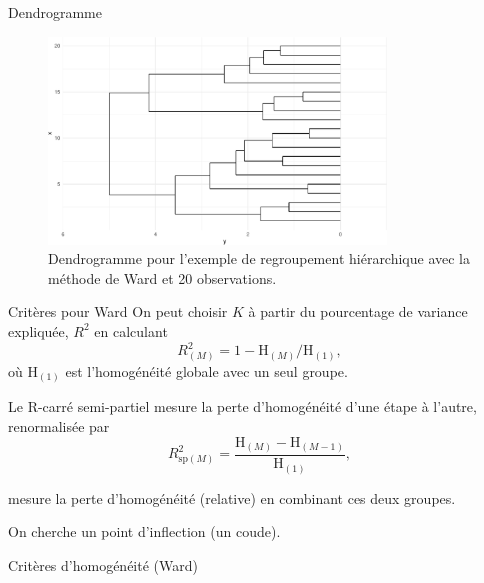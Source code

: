 \documentclass[
  ignorenonframetext,
]{beamer}
\begin{document}
\begin{frame}{Dendrogramme}
\protect\hypertarget{dendrogramme}{}
\begin{figure}

{\centering \includegraphics[width=0.8\textwidth,height=\textheight]{MATH60602-diapos12_files/figure-beamer/fig-dendrogramme-1.pdf}

}

\caption{\label{fig-dendrogramme}Dendrogramme pour l'exemple de
regroupement hiérarchique avec la méthode de Ward et 20 observations.}

\end{figure}
\end{frame}

\begin{frame}{Critères pour Ward}
\protect\hypertarget{crituxe8res-pour-ward}{}
On peut choisir \(K\) à partir du pourcentage de variance expliquée,
\(R^2\) en calculant
\[R^2_{(M)} = 1-\mathrm{H}_{(M)}/\mathrm{H}_{(1)},\] où
\(\mathrm{H}_{(1)}\) est l'homogénéité globale avec un seul groupe.

Le R-carré semi-partiel mesure la perte d'homogénéité d'une étape à
l'autre, renormalisée par
\[R^2_{\text{sp}(M)} =\frac{\mathrm{H}_{(M)} - \mathrm{H}_{(M-1)}}{\mathrm{H}_{(1)}},\]

mesure la perte d'homogénéité (relative) en combinant ces deux groupes.

On cherche un point d'inflection (un coude).
\end{frame}

\begin{frame}{Critères d'homogénéité (Ward)}
\protect\hypertarget{crituxe8res-dhomoguxe9nuxe9ituxe9-ward}{}
\end{frame}
\end{document}
